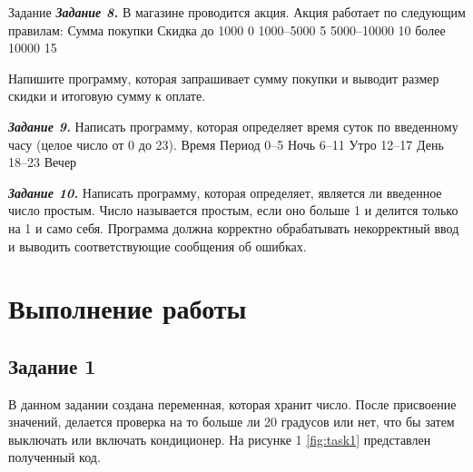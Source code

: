 \documentclass{vvsu}
\begin{document}
\begin{addition}{Задание}
    \textit{\textbf{Задание 8.}}
    В магазине проводится акция. Акция работает по следующим правилам:
    Сумма покупки 	Скидка
    до 1000 	0%
    1000–5000 	5%
    5000–10000 	10%
    более 10000 	15%

    Напишите программу, которая запрашивает сумму покупки и выводит размер скидки и итоговую сумму к оплате.

    \textit{\textbf{Задание 9.}}
    Написать программу, которая определяет время суток по введенному часу (целое число от 0 до 23).
    Время 	Период
    0–5 	Ночь
    6–11 	Утро
    12–17 	День
    18–23 	Вечер

    \textit{\textbf{Задание 10.}}
    Написать программу, которая определяет, является ли введенное число простым. Число называется простым, если оно больше 1 и делится только на 1 и само себя. Программа должна корректно обрабатывать некорректный ввод и выводить соответствующие сообщения об ошибках.

\toc

\section{Выполнение работы}

\subsection{Задание 1}
В данном задании создана переменная, которая хранит число. После присвоение значений, делается проверка на то больше ли 20 градусов или нет, что бы затем выключать или включать кондиционер. На рисунке 1 \ref{fig:task1} представлен полученный код.

\end{addition}
\end{document}
